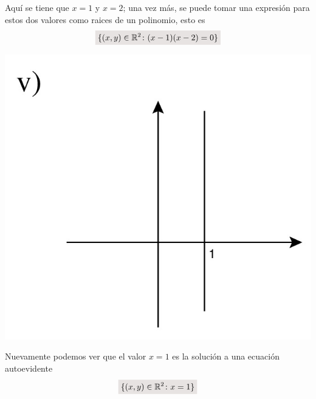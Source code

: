 \documentclass[a4paper,11pt]{article}
\newcommand{\real}{\mathbb{R}}
\newcommand{\resalta}[1]{\colorbox{g}{$\displaystyle #1$}}
\begin{document}
\begin{enumerate}
\begin{enumerate}[label = \roman*)]
\begin{minipage}[c]{0.3\linewidth}
            \end{minipage}
            \begin{minipage}[c]{0.7\linewidth}
                Aqu\'i se tiene que $x=1$ y $x=2$; una vez m\'as, se puede tomar una expresi\'on para estos dos valores como raices de un polinomio, esto es
                \begin{equation}
                    \notag \resalta{\{(x,y)\in \real^{2} \colon (x-1)(x-2)=0\}}
                \end{equation}
            \end{minipage}
            \begin{minipage}[c]{0.3\linewidth}
                \centering
                    \includegraphics[scale=0.15]{4ii-5}
            \end{minipage}
            \begin{minipage}[c]{0.7\linewidth}
                Nuevamente podemos ver que el valor $x=1$ es la soluci\'on a una ecuaci\'on autoevidente
                \begin{equation}
                    \notag \resalta{\{(x,y)\in \real^{2} \colon x=1\}}
                \end{equation}
            \end{minipage}
            \begin{minipage}[c]{0.3\linewidth}
                \centering

\end{minipage}
\end{enumerate}
\end{enumerate}
\end{document}
